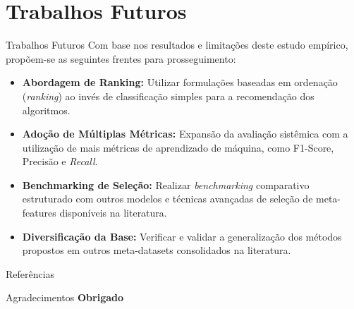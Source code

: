 \documentclass [aspectratio=169]{beamer}
\begin{document}
\section{Trabalhos Futuros}

\begin{frame}{Trabalhos Futuros}
Com base nos resultados e limitações deste estudo empírico, propõem-se as seguintes frentes para prosseguimento:

\vspace{0.3cm}
\begin{itemize}
    \item \textbf{Abordagem de Ranking:} Utilizar formulações baseadas em ordenação (\textit{ranking}) ao invés de classificação simples para a recomendação dos algoritmos.
    \item \textbf{Adoção de Múltiplas Métricas:} Expansão da avaliação sistêmica com a utilização de mais métricas de aprendizado de máquina, como F1-Score, Precisão e \textit{Recall}.
    \item \textbf{Benchmarking de Seleção:} Realizar \textit{benchmarking} comparativo estruturado com outros modelos e técnicas avançadas de seleção de meta-features disponíveis na literatura.
    \item \textbf{Diversificação da Base:} Verificar e validar a generalização dos métodos propostos em outros meta-datasets consolidados na literatura.
\end{itemize}
\end{frame}
\begin{frame}[allowframebreaks]{Referências}
    
    
\end{frame}

\begin{frame}{Agradecimentos}
    \centering
    {\color{uwopurple} \Huge \textbf{Obrigado}} 
\end{frame}
\end{document}
